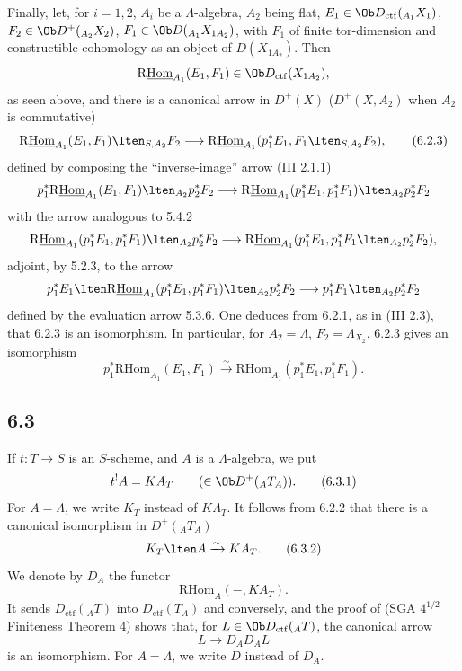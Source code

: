 Finally, let, for $i=1,2$, $A_i$ be a $\Lambda$-algebra, $A_2$ being flat, $E_1\in\Ob D_{\mathrm{ctf}}({}_{A_1}X_1)$, $F_2\in\Ob D^+({}_{A_2}X_2)$, $F_1\in\Ob D({}_{A_1}X_{1A_2})$, with $F_1$ of finite tor-dimension and constructible cohomology as an object of $D(X_{1A_2})$. Then
\[
\mathrm{R}\underline{\mathrm{Hom}}_{A_1}(E_1,F_1)\in\Ob D_{\mathrm{ctf}}(X_{1A_2}),
\]
as seen above, and there is a canonical arrow in $D^+(X)$ ($D^+(X,A_2)$ when $A_2$ is commutative)
\begin{equation}
\mathrm{R}\underline{\mathrm{Hom}}_{A_1}(E_1,F_1)\lten_{S,A_2}F_2
\longrightarrow
\mathrm{R}\underline{\mathrm{Hom}}_{A_1}(p_1^*E_1,F_1\lten_{S,A_2}F_2),
\tag{6.2.3}
\end{equation}
defined by composing the “inverse-image” arrow (III 2.1.1)
\[
p_1^*\mathrm{R}\underline{\mathrm{Hom}}_{A_1}(E_1,F_1)\lten_{A_2}p_2^*F_2
\longrightarrow
\mathrm{R}\underline{\mathrm{Hom}}_{A_1}(p_1^*E_1,p_1^*F_1)\lten_{A_2}p_2^*F_2
\]
with the arrow analogous to 5.4.2
\[
\mathrm{R}\underline{\mathrm{Hom}}_{A_1}(p_1^*E_1,p_1^*F_1)\lten_{A_2}p_2^*F_2
\longrightarrow
\mathrm{R}\underline{\mathrm{Hom}}_{A_1}(p_1^*E_1,p_1^*F_1\lten_{A_2}p_2^*F_2),
\]
adjoint, by 5.2.3, to the arrow
\[
p_1^*E_1\lten\mathrm{R}\underline{\mathrm{Hom}}_{A_1}(p_1^*E_1,p_1^*F_1)\lten_{A_2}p_2^*F_2
\longrightarrow
p_1^*F_1\lten_{A_2}p_2^*F_2
\]
defined by the evaluation arrow 5.3.6. One deduces from 6.2.1, as in (III 2.3), that 6.2.3 is an isomorphism. In particular, for $A_2=\Lambda$, $F_2=\Lambda_{X_2}$, 6.2.3 gives an isomorphism
\begin{equation}
p_1^*\mathrm{R}\underline{\mathrm{Hom}}_{A_1}(E_1,F_1)
\xrightarrow{\sim}
\mathrm{R}\underline{\mathrm{Hom}}_{A_1}(p_1^*E_1,p_1^*F_1).
\tag{6.2.4}
\end{equation}

\subsection*{6.3}
If $t:T\to S$ is an $S$-scheme, and $A$ is a $\Lambda$-algebra, we put
\begin{equation}
t^!A = KA_T \qquad(\in\Ob D^+({}_AT_A)).
\tag{6.3.1}
\end{equation}
For $A=\Lambda$, we write $K_T$ instead of $K\Lambda_T$. It follows from 6.2.2 that there is a canonical isomorphism in $D^+({}_AT_A)$
\begin{equation}
K_T\lten A\xrightarrow{\sim}KA_T.
\tag{6.3.2}
\end{equation}
We denote by $D_A$ the functor
\[
\mathrm{R}\underline{\mathrm{Hom}}_A(-,KA_T).
\]
It sends $D_{\mathrm{ctf}}({}_AT)$ into $D_{\mathrm{ctf}}(T_A)$ and conversely, and the proof of (SGA $4^{1/2}$ Finiteness Theorem 4) shows that, for $L\in\Ob D_{\mathrm{ctf}}({}_AT)$, the canonical arrow
\[
L\longrightarrow D_AD_AL
\]
is an isomorphism. For $A=\Lambda$, we write $D$ instead of $D_A$.

